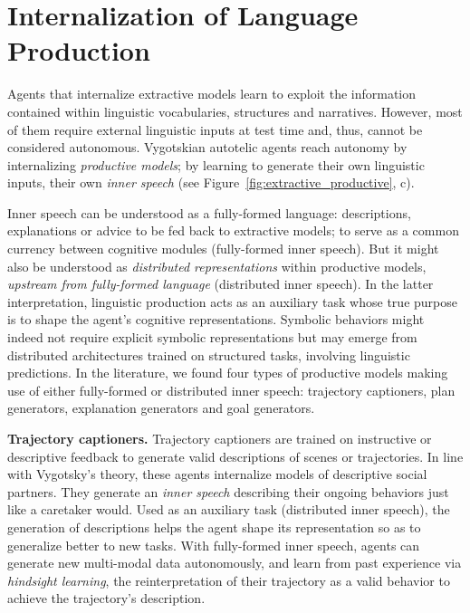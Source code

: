 \section{Internalization of Language Production}
\label{sec:production}

Agents that internalize extractive models learn to exploit the information contained within linguistic vocabularies, structures and narratives. However, most of them require external linguistic inputs at test time and, thus, cannot be considered autonomous. Vygotskian autotelic agents reach autonomy by internalizing \textit{productive models}; \ie by learning to generate their own linguistic inputs, their own \textit{inner speech} (see Figure~\ref{fig:extractive_productive}, c). 

Inner speech can be understood as a fully-formed language: descriptions, explanations or advice to be fed back to extractive models; to serve as a common currency between cognitive modules (fully-formed inner speech).\cite{zeng2022socratic} But it might also be understood as \textit{distributed representations} within productive models, \textit{upstream from fully-formed language} (distributed inner speech). In the latter interpretation, linguistic production acts as an auxiliary task whose true purpose is to shape the agent's cognitive representations. Symbolic behaviors might indeed not require explicit symbolic representations but may emerge from distributed architectures trained on structured tasks, \eg involving linguistic predictions.\cite{mcclelland2010letting,santoro2021symbolic} 
In the literature, we found four types of productive models making use of either fully-formed or distributed inner speech: trajectory captioners, plan generators, explanation generators and goal generators. 

\textbf{Trajectory captioners.} Trajectory captioners are trained on instructive or descriptive feedback to generate valid descriptions of scenes or trajectories.\cite{cideron_higher_2020, zhou_inverse_2020, colas_language_2020, nguyen2021interactive, yan2022intra} In line with Vygotsky's theory, these agents internalize models of descriptive social partners. They generate an \textit{inner speech} describing their ongoing behaviors just like a caretaker would. Used as an auxiliary task (distributed inner speech), the generation of descriptions helps the agent shape its representation so as to generalize better to new tasks.\cite{yan2022intra} With fully-formed inner speech, agents can generate new multi-modal data autonomously, and learn from past experience via \textit{hindsight learning},\cite{andrychowicz_hindsight_2017} \ie the reinterpretation of their trajectory as a valid behavior to achieve the trajectory's description.\cite{zhou_inverse_2020, colas_language_2020, nguyen2021interactive}

